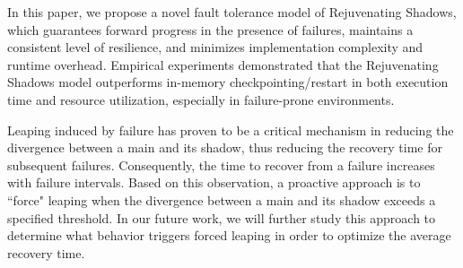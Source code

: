 
In this paper, we propose a novel fault tolerance model of Rejuvenating Shadows, which guarantees forward progress in the presence of failures, maintains a consistent level of resilience, and minimizes implementation complexity and runtime overhead. Empirical experiments demonstrated that the Rejuvenating Shadows model outperforms in-memory checkpointing/restart in both execution time and resource utilization, especially in failure-prone environments.

Leaping induced by failure has proven to be a critical mechanism in reducing the divergence between a main and its shadow, 
thus reducing the recovery time for subsequent failures. Consequently, the time to recover from a failure increases with failure intervals.  
Based on this observation, a proactive approach is to ``force" leaping when the divergence between a main and its shadow exceeds a specified threshold. 
In our future work, we will further study this approach to determine what behavior triggers forced leaping in order to optimize the average recovery time. 





